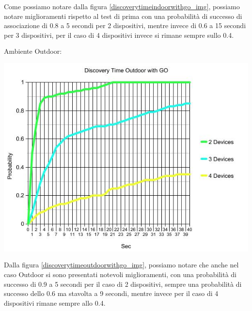Come possiamo notare dalla figura \ref{discoverytimeindoorwithgo_img}, possiamo notare miglioramenti rispetto al test di prima con una probabilità di successo di associazione di 0.8 a 5 secondi per 2 dispositivi, mentre invece di 0.6 a 15 secondi per 3 dispositivi, per il caso di 4 dispositivi invece si rimane sempre sullo 0.4.

Ambiente Outdoor:
\begin{center}
\includegraphics[width=1\textwidth]{imgs/Discovery_Time_Outdoor_with_GO.jpg}
\label{discoverytimeoutdoorwithgo_img}%
\end{center}

Dalla figura \ref{discoverytimeoutdoorwithgo_img}, possiamo notare che anche nel caso Outdoor si sono presentati notevoli miglioramenti, con una probabilità di successo di 0.9 a 5 secondi per il caso di 2 dispositivi, sempre una probabilità di successo dello 0.6 ma stavolta a 9 secondi, mentre invece per il caso di 4 dispositivi rimane sempre allo 0.4.


